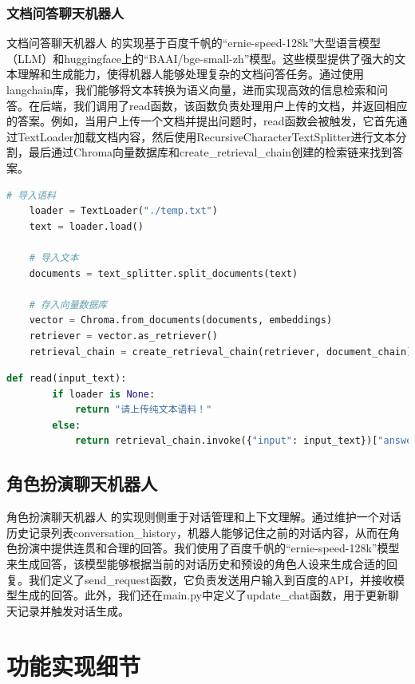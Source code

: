 \documentclass[lang=cn,a4paper,founder,bibend=bibtex,citestyle=gb7714-2015, bibstyle=gb7714-2015]{elegantpaper}
\begin{document}
\subsubsection{文档问答聊天机器人} %

文档问答聊天机器人 的实现基于百度千帆的“ernie-speed-128k”大型语言模型（LLM）和huggingface上的“BAAI/bge-small-zh”模型。这些模型提供了强大的文本理解和生成能力，使得机器人能够处理复杂的文档问答任务。通过使用langchain库，我们能够将文本转换为语义向量，进而实现高效的信息检索和问答。在后端，我们调用了read函数，该函数负责处理用户上传的文档，并返回相应的答案。例如，当用户上传一个文档并提出问题时，read函数会被触发，它首先通过TextLoader加载文档内容，然后使用RecursiveCharacterTextSplitter进行文本分割，最后通过Chroma向量数据库和create\_retrieval\_chain创建的检索链来找到答案。


\begin{lstlisting}[language=python]
	# 导入语料
    loader = TextLoader("./temp.txt")
    text = loader.load()

    # 导入文本
    documents = text_splitter.split_documents(text)

    # 存入向量数据库
    vector = Chroma.from_documents(documents, embeddings)
    retriever = vector.as_retriever()
    retrieval_chain = create_retrieval_chain(retriever, document_chain)
\end{lstlisting}

\begin{lstlisting}[language=python]
	def read(input_text):
		if loader is None:
			return "请上传纯文本语料！"
		else:
			return retrieval_chain.invoke({"input": input_text})["answer"]
\end{lstlisting}

\subsection{角色扮演聊天机器人}

角色扮演聊天机器人 的实现则侧重于对话管理和上下文理解。通过维护一个对话历史记录列表conversation\_history，机器人能够记住之前的对话内容，从而在角色扮演中提供连贯和合理的回答。我们使用了百度千帆的“ernie-speed-128k”模型来生成回答，该模型能够根据当前的对话历史和预设的角色人设来生成合适的回复。我们定义了send\_request函数，它负责发送用户输入到百度的API，并接收模型生成的回答。此外，我们还在main.py中定义了update\_chat函数，用于更新聊天记录并触发对话生成。

\section{功能实现细节}
\end{document}

